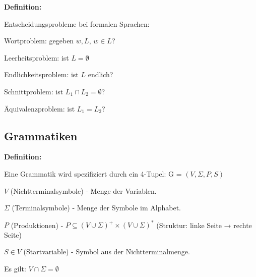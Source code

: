 \documentclass[11pt,
			a4paper,
			parskip=full,
			toc=bib,
			toc=idx,
			toc=listof,
			ngerman
			listof=totoc,]{scrartcl}
\newcommand{\concept}[1]{%
	\sf{%
		\textbf{%
				\textcolor{mymauve}{#1}%
		}%
	}%
	\rm%
}
\newenvironment{objDef}[1]%
{	\begin{framed}
	\textbf{Definition:} \concept{#1}
	\compress}%
{\end{framed}}
\newcommand{\compress}{\vspace{-1em}}
\begin{document}
\compress
\begin{objDef}{Entscheidungsprobleme}

Entscheidungsprobleme bei formalen Sprachen:
\compress
\begin{compactitem}
  \item Wortproblem: gegeben $w,L$, $w ∈ L$?
  \item Leerheitsproblem: ist $L = ∅$
  \item Endlichkeitsproblem: ist $L$ endlich?
  \item Schnittproblem: ist $L_1 ∩ L_2 = ∅$? 
  \item Äquivalenzproblem: ist $L_1 = L_2$?
\end{compactitem} 

\end{objDef}






\newpage
\subsection{Grammatiken}

\compress
\begin{objDef}{Grammatik}

Eine Grammatik wird spezifiziert durch ein 4-Tupel: G = $(V,Σ,P,S)$

\compress
\begin{compactitem}
  \item $V$ (Nichtterminalsymbole)   - Menge der Variablen.
  \item $Σ$ (Terminalsymbole)        - Menge der Symbole im Alphabet.
  \item $P$ (Produktionen)           - $P ⊆ (V ∪ Σ)^+ \times (V ∪ Σ)^*$ (Struktur: linke Seite → rechte Seite)
  \item $S ∈ V$ (Startvariable)      - Symbol aus der Nichtterminalmenge.
\end{compactitem}
\compress
Es gilt: $V ∩ Σ = ∅$

\end{objDef}
\end{document}
